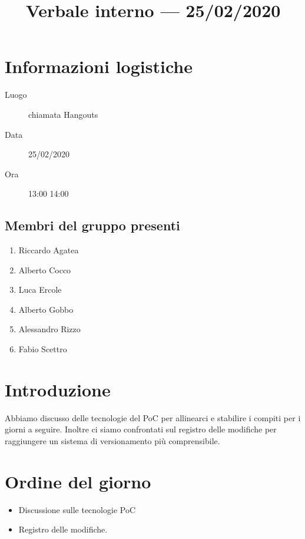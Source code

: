 \documentclass{article}
\title{Verbale interno --- 25/02/2020}
\begin{document}


\section{Informazioni logistiche}%
\label{sec:informazioni_logistiche}

\begin{description}
  \item [Luogo] chiamata Hangouts
  \item [Data] 25/02/2020
  \item [Ora] 13:00  14:00
\end{description}

\subsection{Membri del gruppo presenti}%
\label{sub:membri_del_gruppo_presenti}

\begin{enumerate}
  \item Riccardo Agatea
  \item Alberto Cocco
  \item Luca Ercole
  \item Alberto Gobbo
  \item Alessandro Rizzo
  \item Fabio Scettro
\end{enumerate}

\section{Introduzione}%
\label{sec:introduzione}

Abbiamo discusso delle tecnologie del PoC per allinearci e stabilire i compiti per i giorni a seguire.
Inoltre ci siamo confrontati sul registro delle modifiche per raggiungere un sistema di versionamento più comprensibile.

\section{Ordine del giorno}%
\label{sec:ordine_del_giorno}

\begin{itemize}
  \item Discussione sulle tecnologie PoC
  \item Registro delle modifiche.
\end{itemize}
\end{document}
